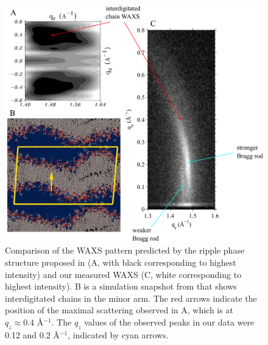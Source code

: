 \begin{figure}[htbp]
  \centering
  \includegraphics[width=\textwidth]{figures/ripple/discussion/ripple_waxs}
  \caption[Comparison of the WAXS pattern predicted by the 
  ripple phase structure proposed in \cite{ref:deVries05} 
  (A, with black corresponding to highest intensity) and
  our measured WAXS (C, white corresponding to highest intensity)]
  {Comparison of the WAXS pattern predicted by the 
  ripple phase structure proposed in \cite{ref:deVries05} 
  (A, with black corresponding to highest intensity) and
  our measured WAXS (C, white corresponding to highest intensity).
  B is a simulation snapshot from \cite{ref:deVries05} that shows 
  interdigitated chains in the minor arm.  
  The red arrows indicate the position of 
  the maximal scattering observed in A, which is at $q_z \approx 0.4$ \AA$^{-1}$.
  The $q_z$ values of the observed peaks in our data were 0.12
  and 0.2 \AA$^{-1}$, indicated by cyan arrows.}
  \label{fig:nGIWAXS_comparison}
\end{figure}

\newpage
